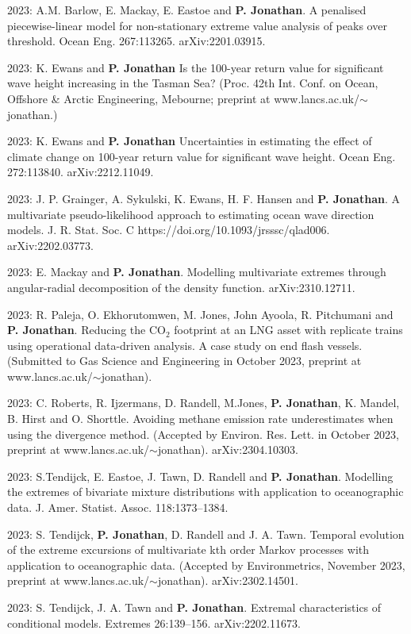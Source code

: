 \documentclass[11pt,a4paper]{moderncv}
\begin{document}
2023:  A.M. Barlow, E. Mackay, E. Eastoe and \textbf{P. Jonathan}. A penalised piecewise-linear model for non-stationary extreme value analysis of peaks over threshold. Ocean Eng. 267:113265. arXiv:2201.03915.

2023: K. Ewans and \textbf{P. Jonathan} Is the 100-year return value for significant wave height increasing in the Tasman Sea? (Proc. 42th Int. Conf. on Ocean, Offshore \& Arctic Engineering, Mebourne; preprint at  www.lancs.ac.uk/$\sim$jonathan.)

2023: K. Ewans and \textbf{P. Jonathan} Uncertainties in estimating the effect of climate change on 100-year return value for significant wave height. Ocean Eng. 272:113840. arXiv:2212.11049.

2023: J. P. Grainger, A. Sykulski, K. Ewans, H. F. Hansen and \textbf{P. Jonathan}. A multivariate pseudo-likelihood approach to estimating ocean wave direction models. J. R. Stat. Soc. C https://doi.org/10.1093/jrsssc/qlad006. arXiv:2202.03773.

2023: E. Mackay and \textbf{P. Jonathan}. Modelling multivariate extremes through angular-radial decomposition of the density function. arXiv:2310.12711.

2023: R. Paleja, O. Ekhorutomwen, M. Jones, John Ayoola, R. Pitchumani and \textbf{P. Jonathan}. Reducing the CO$_2$ footprint at an LNG asset with replicate trains using operational data-driven analysis. A case study on end flash vessels. (Submitted to Gas Science and Engineering in October 2023, preprint at www.lancs.ac.uk/$\sim$jonathan).

2023: C. Roberts, R. Ijzermans, D. Randell, M.Jones, \textbf{P. Jonathan}, K. Mandel, B. Hirst and O. Shorttle. Avoiding methane emission rate underestimates when using the divergence method. (Accepted by Environ. Res. Lett. in October 2023, preprint at www.lancs.ac.uk/$\sim$jonathan). arXiv:2304.10303.

2023: S.Tendijck, E. Eastoe, J. Tawn, D. Randell and \textbf{P. Jonathan}. Modelling the extremes of bivariate mixture distributions with application to oceanographic data. J. Amer. Statist. Assoc. 118:1373--1384.

2023: S. Tendijck, \textbf{P. Jonathan}, D. Randell and J. A. Tawn. Temporal evolution of the extreme excursions of multivariate kth order Markov processes with application to oceanographic data. (Accepted by Environmetrics, November 2023, preprint at www.lancs.ac.uk/$\sim$jonathan). arXiv:2302.14501.

2023: S. Tendijck, J. A. Tawn and \textbf{P. Jonathan}. Extremal characteristics of conditional models. Extremes 26:139–156. arXiv:2202.11673.
\end{document}
